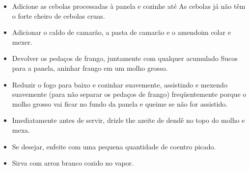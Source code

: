 \documentclass [11pt, letterpaper] {article}
\begin{document}
\begin {description}
\begin {enumerate}
\begin {itemize}
Pimenta nos sucos reduzidos na panela e cozinhe por alguns
minutos até fragante.
\item Adicione as cebolas processadas à panela e cozinhe até
As cebolas já não têm o forte cheiro de cebolas cruas.
\item Adicionar o caldo de camarão, a pasta de camarão e o amendoim
colar e mexer.
\item Devolver os pedaços de frango, juntamente com qualquer acumulado
Sucos para a panela, aninhar frango em um molho grosso.
\item Reduzir o fogo para baixo e cozinhar suavemente, assistindo e
mexendo suavemente (para não separar os pedaços de frango)
freqüentemente porque o molho grosso vai ficar no fundo
da panela e queime se não for assistido.
\item Imediatamente antes de servir, drizle the azeite de dend\^e
no topo do molho e mexa.
\item Se desejar, enfeite com uma pequena quantidade de coentro picado.
\item Sirva com arroz branco cozido no vapor.
\end {itemize}
\end {enumerate}
\end {description}
\end{document}
